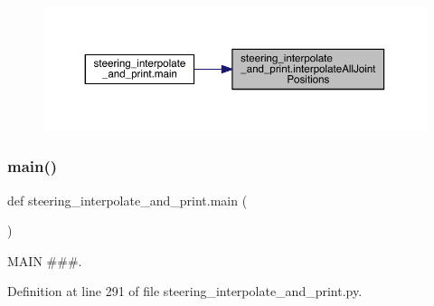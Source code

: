 \begin{figure}[H]
\begin{center}
\leavevmode
\includegraphics[width=350pt]{namespacesteering__interpolate__and__print_ae7e7cca01e99c10286aea890f5aaa0ef_icgraph}
\end{center}
\end{figure}
\mbox{\label{namespacesteering__interpolate__and__print_aa2a632b8d620697929911569ba53daf3}} 
\subsubsection{\texorpdfstring{main()}{main()}}
{\footnotesize\ttfamily def steering\+\_\+interpolate\+\_\+and\+\_\+print.\+main (\begin{DoxyParamCaption}{ }\end{DoxyParamCaption})}



M\+A\+IN \#\#\#. 



Definition at line 291 of file steering\+\_\+interpolate\+\_\+and\+\_\+print.\+py.



